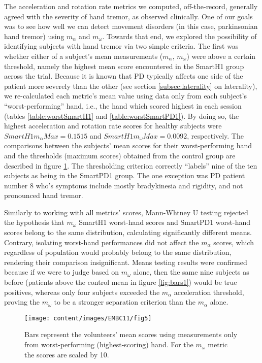 The acceleration and rotation rate metrics we computed, off-the-record, generally agreed with the severity of hand tremor, as observed clinically. One of our goals was to see how well we can detect movement disorders (in this case, parkinsonian hand tremor) using $m_{\alpha}$ and $m_{\omega}$. Towards that end, we explored the possibility of identifying subjects with hand tremor via two simple criteria. The first was whether either of a subject's mean measurements ($m_{\alpha}$, $m_{\omega}$) were above a certain threshold, namely the highest mean score encountered in the \gls{SmartH1} group across the trial. Because it is known that \gls{PD} typically affects one side of the patient more severely than the other (see section \ref{subsec:laterality} on laterality), we re-calculated each metric's mean value using data only from each subject's ``worst-performing'' hand, i.e., the hand which scored highest in each session (tables \ref{table:worstSmartH1} and \ref{table:worstSmartPD1}). By doing so, the highest acceleration and rotation rate scores for healthy subjects were $SmartH1m_{\alpha}Max=0.1515$ and $SmartH1m_{\omega}Max=0.0092$, respectively.  The comparisons between the subjects' mean scores for their worst-performing hand and the thresholds (maximum scores) obtained from the control group are described in figure \ref{fig:bars2}. The thresholding criterion correctly ``labels'' nine of the ten subjects as being in the \gls{SmartPD1} group. The one exception was \gls{PD} patient number 8 who's symptoms include mostly bradykinesia and rigidity, and not pronounced hand tremor.

Similarly to working with all metrics' scores, Mann-Whtney U testing rejected the hypothesis that $m_{\omega}$ \gls{SmartH1} worst-hand scores and \gls{SmartPD1} worst-hand scores belong to the same distribution, calculating significantly different means. Contrary, isolating worst-hand performances did not affect the $m_{\alpha}$ scores, which regardless of population would probably belong to the same distribution, rendering their comparison insignificant. Means testing results were confirmed because if we were to judge based on  $m_{\omega}$ alone, then the same nine subjects as before (patients above the control mean in figure \ref{fig:bars1}) would be true positives, whereas only four subjects exceeded the $m_{\alpha}$ acceleration threshold, proving the $m_{\omega}$ to be a stronger separation criterion than the $m_{\alpha}$ alone.

\begin{figure}[!htp]
	\centering
	\texttt{[image: content/images/EMBC11/fig5]}
	\caption{Bars represent the volunteers' mean scores using measurements only from worst-performing (highest-scoring) hand. For the $m_{\omega}$ metric the scores are scaled by 10.}
	\label{fig:bars2}
\end{figure}

